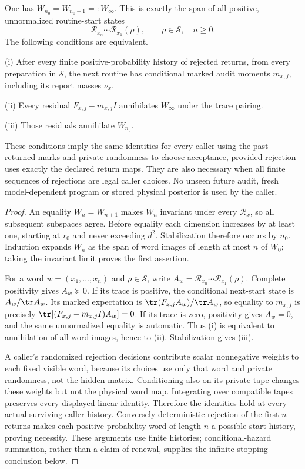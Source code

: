\begin{theorem}\label{thm:return-span}
One has $W_{n_0}=W_{n_0+1}=:W_\infty$. This is exactly the span of all positive, unnormalized routine-start states
\[
 \mathcal R_{x_n}\cdots\mathcal R_{x_1}(\rho),
 \qquad \rho\in\mathcal S,\quad n\ge0.
\]
The following conditions are equivalent.

\textup{(i)} After every finite positive-probability history of rejected returns, from every preparation in $\mathcal S$, the next routine has conditional marked audit moments $m_{x,j}$, including its report masses $\nu_x$.

\textup{(ii)} Every residual $F_{x,j}-m_{x,j}I$ annihilates $W_\infty$ under the trace pairing.

\textup{(iii)} Those residuals annihilate $W_{n_0}$.

These conditions imply the same identities for every caller using the past returned marks and private randomness to choose acceptance, provided rejection uses exactly the declared return maps. They are also necessary when all finite sequences of rejections are legal caller choices. No unseen future audit, fresh model-dependent program or stored physical posterior is used by the caller.
\end{theorem}
\begin{proof}
An equality $W_n=W_{n+1}$ makes $W_n$ invariant under every $\mathcal R_x$, so all subsequent subspaces agree. Before equality each dimension increases by at least one, starting at $r_0$ and never exceeding $d^2$. Stabilization therefore occurs by $n_0$. Induction expands $W_n$ as the span of word images of length at most $n$ of $W_0$; taking the invariant limit proves the first assertion.

For a word $w=(x_1,\ldots,x_n)$ and $\rho\in\mathcal S$, write $A_w=\mathcal R_{x_n}\cdots\mathcal R_{x_1}(\rho)$. Complete positivity gives $A_w\succeq0$. If its trace is positive, the conditional next-start state is $A_w/\tr A_w$. Its marked expectation is $\tr(F_{x,j}A_w)/\tr A_w$, so equality to $m_{x,j}$ is precisely $\tr[(F_{x,j}-m_{x,j}I)A_w]=0$. If its trace is zero, positivity gives $A_w=0$, and the same unnormalized equality is automatic. Thus (i) is equivalent to annihilation of all word images, hence to (ii). Stabilization gives (iii).

A caller's randomized rejection decisions contribute scalar nonnegative weights to each fixed visible word, because its choices use only that word and private randomness, not the hidden matrix. Conditioning also on its private tape changes these weights but not the physical word map. Integrating over compatible tapes preserves every displayed linear identity. Therefore the identities hold at every actual surviving caller history. Conversely deterministic rejection of the first $n$ returns makes each positive-probability word of length $n$ a possible start history, proving necessity. These arguments use finite histories; conditional-hazard summation, rather than a claim of renewal, supplies the infinite stopping conclusion below.
\end{proof}

